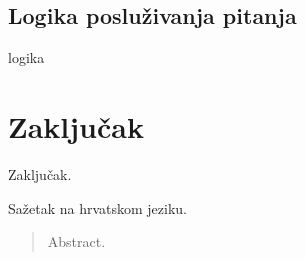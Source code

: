 \documentclass[times, utf8, zavrsni]{fer}
\begin{document}
\section{Logika posluživanja pitanja}
logika

\chapter{Zaključak}
Zaključak.




\begin{sazetak}
Sažetak na hrvatskom jeziku.

\end{sazetak}

\begin{abstract}
Abstract.

\end{abstract}
\end{document}

